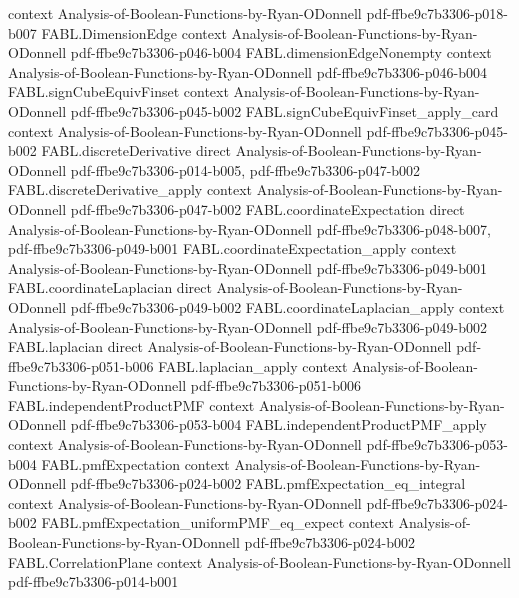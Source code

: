 \begin{theorem}
  {context}
  {Analysis-of-Boolean-Functions-by-Ryan-ODonnell}
  {pdf-ffbe9c7b3306-p018-b007}
\proofstep
  {FABL.DimensionEdge}
  {context}
  {Analysis-of-Boolean-Functions-by-Ryan-ODonnell}
  {pdf-ffbe9c7b3306-p046-b004}
\proofstep
  {FABL.dimensionEdgeNonempty}
  {context}
  {Analysis-of-Boolean-Functions-by-Ryan-ODonnell}
  {pdf-ffbe9c7b3306-p046-b004}
\proofstep
  {FABL.signCubeEquivFinset}
  {context}
  {Analysis-of-Boolean-Functions-by-Ryan-ODonnell}
  {pdf-ffbe9c7b3306-p045-b002}
\proofstep
  {FABL.signCubeEquivFinset_apply_card}
  {context}
  {Analysis-of-Boolean-Functions-by-Ryan-ODonnell}
  {pdf-ffbe9c7b3306-p045-b002}
\proofstep
  {FABL.discreteDerivative}
  {direct}
  {Analysis-of-Boolean-Functions-by-Ryan-ODonnell}
  {pdf-ffbe9c7b3306-p014-b005,
    pdf-ffbe9c7b3306-p047-b002}
\proofstep
  {FABL.discreteDerivative_apply}
  {context}
  {Analysis-of-Boolean-Functions-by-Ryan-ODonnell}
  {pdf-ffbe9c7b3306-p047-b002}
\proofstep
  {FABL.coordinateExpectation}
  {direct}
  {Analysis-of-Boolean-Functions-by-Ryan-ODonnell}
  {pdf-ffbe9c7b3306-p048-b007,
    pdf-ffbe9c7b3306-p049-b001}
\proofstep
  {FABL.coordinateExpectation_apply}
  {context}
  {Analysis-of-Boolean-Functions-by-Ryan-ODonnell}
  {pdf-ffbe9c7b3306-p049-b001}
\proofstep
  {FABL.coordinateLaplacian}
  {direct}
  {Analysis-of-Boolean-Functions-by-Ryan-ODonnell}
  {pdf-ffbe9c7b3306-p049-b002}
\proofstep
  {FABL.coordinateLaplacian_apply}
  {context}
  {Analysis-of-Boolean-Functions-by-Ryan-ODonnell}
  {pdf-ffbe9c7b3306-p049-b002}
\proofstep
  {FABL.laplacian}
  {direct}
  {Analysis-of-Boolean-Functions-by-Ryan-ODonnell}
  {pdf-ffbe9c7b3306-p051-b006}
\proofstep
  {FABL.laplacian_apply}
  {context}
  {Analysis-of-Boolean-Functions-by-Ryan-ODonnell}
  {pdf-ffbe9c7b3306-p051-b006}
\proofstep
  {FABL.independentProductPMF}
  {context}
  {Analysis-of-Boolean-Functions-by-Ryan-ODonnell}
  {pdf-ffbe9c7b3306-p053-b004}
\proofstep
  {FABL.independentProductPMF_apply}
  {context}
  {Analysis-of-Boolean-Functions-by-Ryan-ODonnell}
  {pdf-ffbe9c7b3306-p053-b004}
\proofstep
  {FABL.pmfExpectation}
  {context}
  {Analysis-of-Boolean-Functions-by-Ryan-ODonnell}
  {pdf-ffbe9c7b3306-p024-b002}
\proofstep
  {FABL.pmfExpectation_eq_integral}
  {context}
  {Analysis-of-Boolean-Functions-by-Ryan-ODonnell}
  {pdf-ffbe9c7b3306-p024-b002}
\proofstep
  {FABL.pmfExpectation_uniformPMF_eq_expect}
  {context}
  {Analysis-of-Boolean-Functions-by-Ryan-ODonnell}
  {pdf-ffbe9c7b3306-p024-b002}
\proofstep
  {FABL.CorrelationPlane}
  {context}
  {Analysis-of-Boolean-Functions-by-Ryan-ODonnell}
  {pdf-ffbe9c7b3306-p014-b001}

\end{theorem}

